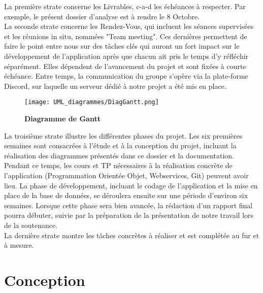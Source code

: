 \documentclass[11pt]{article}
\begin{document}
La première strate concerne les Livrables, c-a-d les échéances à respecter. Par exemple, le présent dossier d'analyse est à rendre le 8 Octobre.\\

La seconde strate concerne les Rendez-Vous, qui incluent les séances supervisées et les réunions in situ, nommées "Team meeting". Ces dernières permettent de faire le point entre nous sur des tâches clés qui auront un fort impact sur le développement de l'application après que chacun ait pris le temps d'y réfléchir séparément. Elles dépendent de l'avancement du projet et sont fixées à courte échéance. Entre temps, la communication du groupe s'opère via la plate-forme Discord, sur laquelle un serveur dédié à notre projet a été mis en place.\\

\begin{figure}[H]
    \caption{\textbf{Diagramme de Gantt}}
    \label{UML_gantt}
    \centering
    \texttt{[image: UML\_diagrammes/DiagGantt.png]}
\end{figure}

La troisième strate illustre les différentes phases du projet. Les six premières semaines sont consacrées à l'étude et à la conception du projet, incluant la réalisation des diagrammes présentés dans ce dossier et la documentation. Pendant ce temps, les cours et TP nécessaires à la réalisation concrète de l'application (Programmation Orientée Objet, Webservices, Git) peuvent avoir lieu. La phase de développement, incluant le codage de l'application et la mise en place de la base de données, se déroulera ensuite sur une période d'environ six semaines. Lorsque cette phase sera bien avancée, la rédaction d'un rapport final pourra débuter, suivie par la préparation de la présentation de notre travail lors de la soutenance.\\

La dernière strate montre les tâches concrètes à réaliser et est complétée au fur et à mesure.\\






\newpage
\section{Conception}
\end{document}
